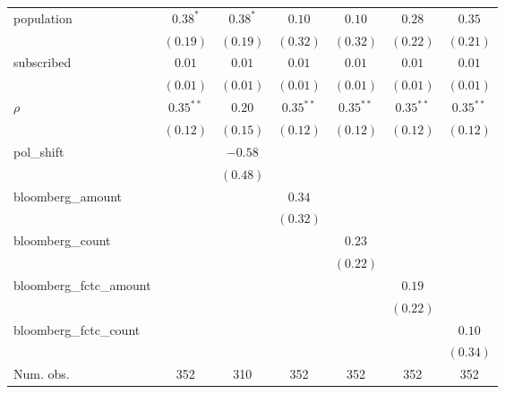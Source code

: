 \begin{table}[!h]
\begin{center}
\begin{tabular}{l c c c c c c }
population              & $0.38^{*}$   & $0.38^{*}$   & $0.10$       & $0.10$       & $0.28$       & $0.35$       \\
                        & $(0.19)$     & $(0.19)$     & $(0.32)$     & $(0.32)$     & $(0.22)$     & $(0.21)$     \\
subscribed              & $0.01$       & $0.01$       & $0.01$       & $0.01$       & $0.01$       & $0.01$       \\
                        & $(0.01)$     & $(0.01)$     & $(0.01)$     & $(0.01)$     & $(0.01)$     & $(0.01)$     \\
$\rho$                  & $0.35^{**}$  & $0.20$       & $0.35^{**}$  & $0.35^{**}$  & $0.35^{**}$  & $0.35^{**}$  \\
                        & $(0.12)$     & $(0.15)$     & $(0.12)$     & $(0.12)$     & $(0.12)$     & $(0.12)$     \\
pol\_shift              &              & $-0.58$      &              &              &              &              \\
                        &              & $(0.48)$     &              &              &              &              \\
bloomberg\_amount       &              &              & $0.34$       &              &              &              \\
                        &              &              & $(0.32)$     &              &              &              \\
bloomberg\_count        &              &              &              & $0.23$       &              &              \\
                        &              &              &              & $(0.22)$     &              &              \\
bloomberg\_fctc\_amount &              &              &              &              & $0.19$       &              \\
                        &              &              &              &              & $(0.22)$     &              \\
bloomberg\_fctc\_count  &              &              &              &              &              & $0.10$       \\
                        &              &              &              &              &              & $(0.34)$     \\
\midrule
Num. obs.               & 352          & 310          & 352          & 352          & 352          & 352          \\

\end{tabular}
\end{center}
\end{table}
